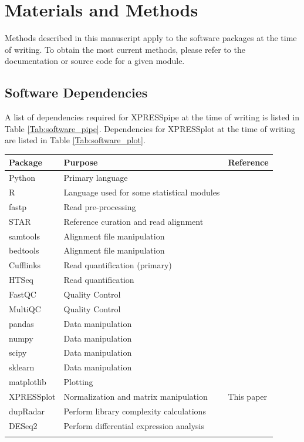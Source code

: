 \documentclass[11pt, a4paper, oneside]{article}
\begin{document}
\section{Materials and Methods}
Methods described in this manuscript apply to the software packages at the time of writing. To obtain the most current methods, please refer to the documentation or source code for a given module.

\subsection{Software Dependencies}
A list of dependencies required for XPRESSpipe at the time of writing is listed in Table \ref{Tab:software_pipe}. Dependencies for XPRESSplot at the time of writing are listed in Table \ref{Tab:software_plot}.

\begin{tabular}{p{2.4cm}p{7.5cm}p{3cm}}
 \textbf{Package} & \textbf{Purpose} & \textbf{Reference} \\
 \hline
 Python & Primary language & \\
 \hline
 R & Language used for some statistical modules & \\
 \hline
 fastp & Read pre-processing & \cite{fastp} \\
 \hline
 STAR & Reference curation and read alignment & \cite{star} \\
 \hline
 samtools & Alignment file manipulation & \cite{samtools} \\
 \hline
 bedtools & Alignment file manipulation & \cite{bedtools} \\
 \hline
 Cufflinks & Read quantification (primary) & \cite{cufflinks} \\
 \hline
 HTSeq & Read quantification & \cite{htseq} \\
 \hline
 FastQC & Quality Control & \cite{fastqc} \\
 \hline
 MultiQC & Quality Control & \cite{multiqc} \\
 \hline
 pandas & Data manipulation & \cite{pandas} \\
 \hline
 numpy & Data manipulation & \cite{numpy1, numpy2} \\
 \hline
 scipy & Data manipulation & \cite{scipy} \\
 \hline
 sklearn & Data manipulation & \cite{sklearn} \\
 \hline
 matplotlib & Plotting & \cite{matplotlib} \\
 \hline
 XPRESSplot & Normalization and matrix manipulation & This paper \\
 \hline
 dupRadar & Perform library complexity calculations & \cite{dupradar} \\
 \hline
 DESeq2 & Perform differential expression analysis & \cite{deseq2} \\
 \label{Tab:software_pipe}
\end{tabular}
\newline
\end{document}
